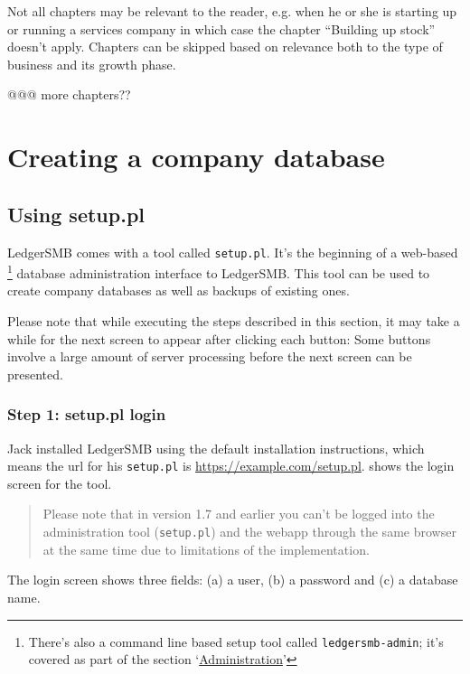 Not all chapters may be relevant to the reader, e.g. when he or she is starting up or
running a services company in which case the chapter ``Building up stock'' doesn't apply.
Chapters can be skipped based on relevance both to the type of business and its growth
phase.

@@@ more chapters??


\chapter{Creating a company database}
\label{cha-company-creation}

\section{Using setup.pl}
\label{sec-create-using-setup}

LedgerSMB comes with a tool called \texttt{setup.pl}. It's the beginning of a web-based
\footnote{There's also a command line based setup tool called \texttt{ledgersmb-admin}; it's covered as part of the section \lq\hyperref[part-administration]{Administration}\rq}
database administration interface to LedgerSMB. This tool can be used to create
company databases as well as backups of existing ones.

Please note that while executing the steps described in this section, it may take a while
for the next screen to appear after clicking each button: Some buttons involve
a large amount of server processing before the next screen can be presented.

\subsection{Step 1: setup.pl login}
\label{subsec-create-setup-login}

Jack installed LedgerSMB using the default installation instructions, which means
the url for his \texttt{setup.pl} is \url{https://example.com/setup.pl}.
 shows the login screen for the tool.

\begin{quote}
Please note that in version 1.7 and earlier you can't be logged into the administration tool
(\texttt{setup.pl}) and the webapp through the same browser at the same time due to limitations of the
implementation.
\end{quote}

The login screen shows three fields: (a) a user, (b) a password and (c) a database name.

